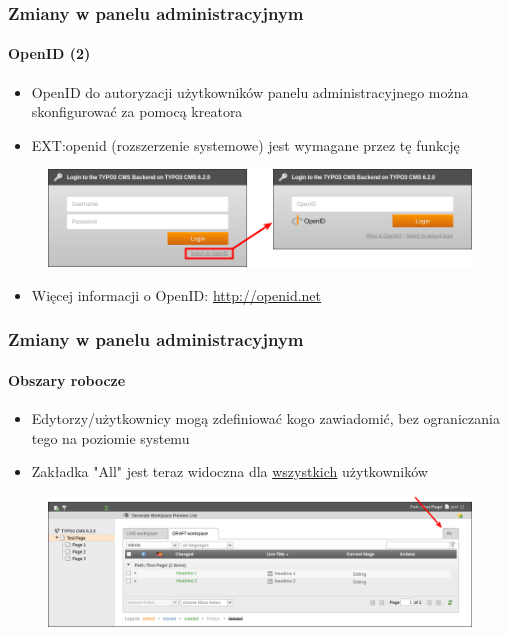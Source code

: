 
\begin{frame}[fragile]
	\frametitle{Zmiany w panelu administracyjnym}
	\framesubtitle{OpenID (2)}

 	\begin{itemize}
		\item OpenID do autoryzacji użytkowników panelu administracyjnego można skonfigurować za pomocą kreatora
		\item EXT:openid (rozszerzenie systemowe) jest wymagane przez tę funkcję
	\end{itemize}

	\begin{figure}
		\includegraphics[width=0.8\linewidth]{Images/BackendChanges/OpenIdLogin.png}
	\end{figure}

 	\begin{itemize}
		\item Więcej informacji o OpenID:\newline
			\small\url{http://openid.net}\normalsize
	\end{itemize}

\end{frame}


\begin{frame}[fragile]
	\frametitle{Zmiany w panelu administracyjnym}
	\framesubtitle{Obszary robocze}

 	\begin{itemize}
		\item Edytorzy/użytkownicy mogą zdefiniować kogo zawiadomić, bez ograniczania tego na poziomie systemu
		\item Zakładka "All" jest teraz widoczna dla \underline{wszystkich} użytkowników
	\end{itemize}

	\begin{figure}
		\includegraphics[width=0.95\linewidth]{Images/BackendChanges/WorkspacesTabAll.png}
	\end{figure}

\end{frame}


